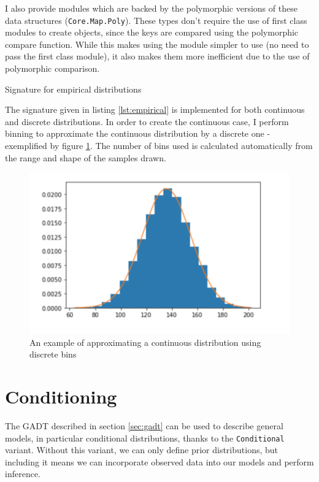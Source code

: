 I also provide modules which are backed by the polymorphic versions of these data structures (\texttt{Core.Map.Poly}). These types don't require the use of first class modules to create objects, since the keys are compared using the polymorphic compare function. While this makes using the module simpler to use (no need to pass the first class module), it also makes them more inefficient due to the use of polymorphic comparison.

\begin{listing}[ht]
	\caption{Signature for empirical distributions}
	\label{lst:empirical}
\end{listing}

The signature given in listing \ref{lst:empirical} is implemented for both continuous and discrete distributions. In order to create the continuous case, I perform binning to approximate the continuous distribution by a discrete one - exemplified by figure \ref{fig:binning}. The number of bins used is calculated automatically from the range and shape of the samples drawn.

\begin{figure}[!hb]
	\centering
	\includegraphics[width=\textwidth]{figs/bins.png}
	\caption{An example of approximating a continuous distribution using discrete bins}
	\label{fig:binning}
\end{figure}

\section{Conditioning} \label{sec:condition}

The GADT described in section \ref{sec:gadt} can be used to describe general models, in particular conditional distributions, thanks to the \texttt{Conditional} variant. Without this variant, we can only define prior distributions, but including it means we can incorporate observed data into our models and perform inference.

